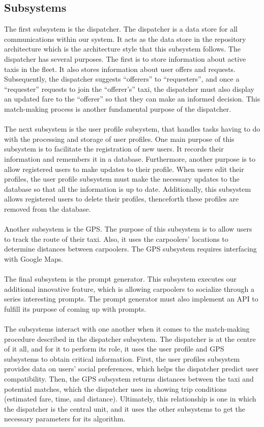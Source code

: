 \documentclass[]{article}
\begin{document}
\subsection{Subsystems}
\label{sub:subsystems}
The first subsystem is the dispatcher. The dispatcher is a data store for all communications within our system. It acts as the data store in the repository architecture which is the architecture style that this subsystem follows. The dispatcher has several purposes. The first is to store information about active taxis in the fleet. It also stores information about user offers and requests. Subsequently, the dispatcher suggests “offerers” to “requesters”, and once a “requester” requests to join the “offerer’s” taxi, the dispatcher must also display an updated fare to the “offerer” so that they can make an informed decision. This match-making process is another fundamental purpose of the dispatcher.
\\\\
The next subsystem is the user profile subsystem, that handles tasks having to do with the processing and storage of user profiles. One main purpose of this subsystem is to facilitate the registration of new users. It records their information and remembers it in a database. Furthermore, another purpose is to allow registered users to make updates to their profile. When users edit their profiles, the user profile subsystem must make the necessary updates to the database so that all the information is up to date. Additionally, this subsystem allows registered users to delete their profiles, thenceforth these profiles are removed from the database.
\\\\
Another subsystem is the GPS. The purpose of this subsystem is to allow users to track the route of their taxi. Also, it uses the carpoolers’ locations to determine distances between carpoolers. The GPS subsystem requires interfacing with Google Maps.
\\\\
The final subsystem is the prompt generator. This subsystem executes our additional innovative feature, which is allowing carpoolers to socialize through a series interesting prompts. The prompt generator must also implement an API to fulfill its purpose of coming up with prompts.
\\\\
The subsystems interact with one another when it comes to the match-making procedure described in the dispatcher subsystem. The dispatcher is at the centre of it all, and for it to perform its role, it uses the user profile and GPS subsystems to obtain critical information. First, the user profiles subsystem provides data on users’ social preferences, which helps the dispatcher predict user compatibility. Then, the GPS subsystem returns distances between the taxi and potential matches, which the dispatcher uses in showing trip conditions (estimated fare, time, and distance). Ultimately, this relationship is one in which the dispatcher is the central unit, and it uses the other subsystems to get the necessary parameters for its algorithm.
\\
\end{document}

